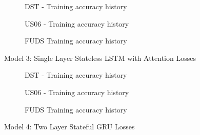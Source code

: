 \begin{figure}[htbp]
    \centering
    \begin{subfigure}[b]{0.95\textwidth}
        \centering
        
        \caption{DST - Training accuracy history}
    \end{subfigure}
    \hfill
    \begin{subfigure}[b]{0.95\textwidth}
        \centering
        
        \caption{US06 - Training accuracy history}
    \end{subfigure}
    \hfill
    \begin{subfigure}[b]{0.95\textwidth}
        \centering
        
        \caption{FUDS Training accuracy history}
    \end{subfigure}    
    \caption{Model 3: Single Layer Stateless LSTM with Attention Losses}
    \label{fig:Model-3losses}
\end{figure}
\begin{figure}[htbp]
    \centering
    \begin{subfigure}[b]{0.95\textwidth}
        \centering
        
        \caption{DST - Training accuracy history}
    \end{subfigure}
    \hfill
    \begin{subfigure}[b]{0.95\textwidth}
        \centering
        
        \caption{US06 - Training accuracy history}
    \end{subfigure}
    \hfill
    \begin{subfigure}[b]{0.95\textwidth}
        \centering
        
        \caption{FUDS Training accuracy history}
    \end{subfigure}    
    \caption{Model 4: Two Layer Stateful GRU Losses}
    \label{fig:Model-4losses}
\end{figure}
